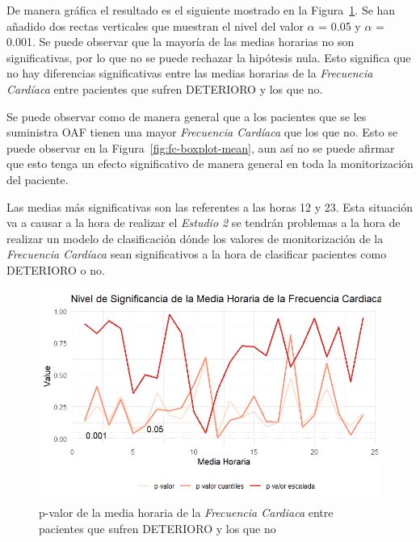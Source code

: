 De manera gráfica el resultado es el siguiente mostrado en la Figura~\ref{fig:mean-FC}. Se han añadido dos rectas verticales que muestran el nivel del valor $\alpha$ = 0.05 y $\alpha$ = 0.001. Se puede observar que la mayoría de las medias horarias no son significativas, por lo que no se puede rechazar la hipótesis nula. Esto significa que no hay diferencias significativas entre las medias horarias de la \textit{Frecuencia Cardíaca} entre pacientes que sufren DETERIORO y los que no.

Se puede observar como de manera general que a los pacientes que se les suministra OAF tienen una mayor \textit{Frecuencia Cardíaca} que los que no. Esto se puede observar en la Figura~\ref{fig:fc-boxplot-mean}, aun así no se puede afirmar que esto tenga un efecto significativo de manera general en toda la monitorización del paciente.

Las medias más significativas son las referentes a las horas 12 y 23. Esta situación va a causar a la hora de realizar el \textit{Estudio 2} se tendrán problemas a la hora de realizar un modelo de clasificación dónde los valores de monitorización de la \textit{Frecuencia Cardíaca} sean significativos a la hora de clasificar pacientes como DETERIORO o no.

\begin{figure}[H]
    \centering
    \includegraphics[scale = 1]{./img/mean-FC.png}
    \caption{p-valor de la media horaria de la \textit{Frecuencia Cardiaca} entre pacientes que sufren DETERIORO y los que no}
    \label{fig:mean-FC}
\end{figure}

